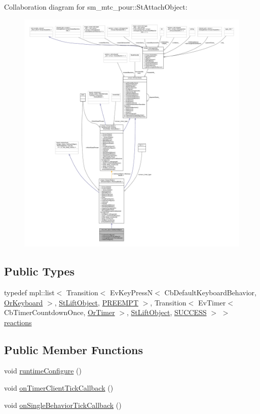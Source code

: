 Collaboration diagram for sm\+\_\+mtc\+\_\+pour\+:\+:St\+Attach\+Object\+:
\nopagebreak
\begin{figure}[H]
\begin{center}
\leavevmode
\includegraphics[width=350pt]{structsm__mtc__pour_1_1StAttachObject__coll__graph}
\end{center}
\end{figure}
\subsection*{Public Types}
\begin{DoxyCompactItemize}
\item 
typedef mpl\+::list$<$ Transition$<$ Ev\+Key\+PressN$<$ Cb\+Default\+Keyboard\+Behavior, \hyperlink{classsm__mtc__pour_1_1OrKeyboard}{Or\+Keyboard} $>$, \hyperlink{structsm__mtc__pour_1_1StLiftObject}{St\+Lift\+Object}, \hyperlink{classPREEMPT}{P\+R\+E\+E\+M\+PT} $>$, Transition$<$ Ev\+Timer$<$ Cb\+Timer\+Countdown\+Once, \hyperlink{classsm__mtc__pour_1_1OrTimer}{Or\+Timer} $>$, \hyperlink{structsm__mtc__pour_1_1StLiftObject}{St\+Lift\+Object}, \hyperlink{classSUCCESS}{S\+U\+C\+C\+E\+SS} $>$ $>$ \hyperlink{structsm__mtc__pour_1_1StAttachObject_a8fdbbbf0d35e1a54294081cd02b8faf1}{reactions}
\end{DoxyCompactItemize}
\subsection*{Public Member Functions}
\begin{DoxyCompactItemize}
\item 
void \hyperlink{structsm__mtc__pour_1_1StAttachObject_a2fd479c9ac8025e4734d22914350d231}{runtime\+Configure} ()
\item 
void \hyperlink{structsm__mtc__pour_1_1StAttachObject_a463a4fb39e659aa47290594444c69ffb}{on\+Timer\+Client\+Tick\+Callback} ()
\item 
void \hyperlink{structsm__mtc__pour_1_1StAttachObject_ab6125fdad86adc14d1bd98d74d50333f}{on\+Single\+Behavior\+Tick\+Callback} ()
\end{DoxyCompactItemize}
